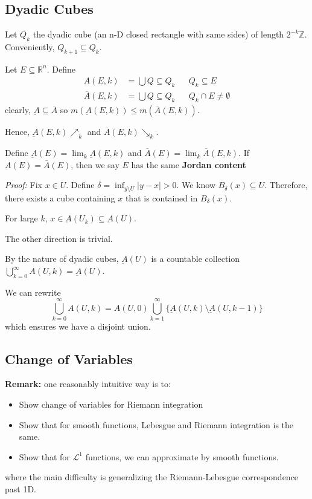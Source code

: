 \documentclass[12pt]{report}
\newcommand{\R}{\mathbb{R}}
\newcommand{\Z}{\mathbb{Z}}
\newcommand{\abs}[1]{\left\vert #1 \right\vert}
\renewcommand{\L}{\mathcal{L}}
\newcommand{\sub}{\subseteq}
\renewcommand{\bar}[1]{\overline{#1}}
\newcommand*{\tbf}[1]{\ifmmode\mathbf{#1}\else\textbf{#1}\fi}
\newenvironment*{tbox}[2][gray]{
    \begin{tcolorbox}[
        parbox=false,
        colback=#1!5!white,
        colframe=#1!75!black,
        breakable,
        title={#2}
    ]}
    {\end{tcolorbox}}
\begin{document}
\subsection{Dyadic Cubes}
    Let $Q_k$ the dyadic cube (an n-D closed rectangle with same sides) of length $2^{-k} \Z$. Conveniently, $Q_{k+1} \sub Q_k$. 

    Let $E \sub \R^n$. Define 
    \begin{align*}
        \underbar A(E, k) &= \bigcup Q \sub Q_k && Q_k \sub E\\ 
        \bar A(E, k) &= \bigcup Q \sub Q_k && Q_k \cap E \neq \emptyset 
    \end{align*}
    clearly, $\underbar A \sub \bar A$ so $m(\underbar A(E, k)) \leq m(\bar A(E, k))$. 

    Hence, $\underbar A(E, k) \nearrow_k$ and $\bar A(E, k) \searrow_k$.

    Define $\underbar A(E) = \lim_k \underbar A(E, k)$ and $\bar A(E) = \lim_k \bar A(E, k)$. If $\underbar A(E) = \bar A(E)$, then we say $E$ has the same \tbf{Jordan content}

    \begin{tbox}{\textbf{Lemma:} Let $U$ be open, then $U = \underbar A(U)$. Moreover, $U$ is a countable union of disjoint cubes}
        \emph{Proof:} Fix $x \in U$. Define $\delta = \inf_{y \setminus U} \abs{y - x} > 0$. We know $B_{\delta}(x) \sub U$. Therefore, there exists a cube containing $x$ that is contained in $B_{\delta}(x)$.

        For large $k$, $x \in \underbar A(U_k) \sub \underbar A(U)$.

        The other direction is trivial.

        By the nature of dyadic cubes, $\underbar A(U)$ is a countable collection $\bigcup_{k=0}^{\infty} A(U, k) = \underbar A(U)$. 

        We can rewrite 
        \[\bigcup_{k=0}^{\infty} A(U, k)  = A(U, 0) \bigcup_{k=1}^\infty \{\underbar A(U, k) \setminus \underbar A(U, k-1)\}\]
        which ensures we have a disjoint union. 
    \end{tbox}

\subsection{Change of Variables}
    \tbf{Remark:} one reasonably intuitive way is to:
    \begin{itemize}
        \item Show change of variables for Riemann integration 
        \item Show that for smooth functions, Lebesgue and Riemann integration is the same.
        \item Show that for $\L^1$ functions, we can approximate by smooth functions.
    \end{itemize} 
    where the main difficulty is generalizing the Riemann-Lebesgue correspondence past 1D. 
\end{document}
